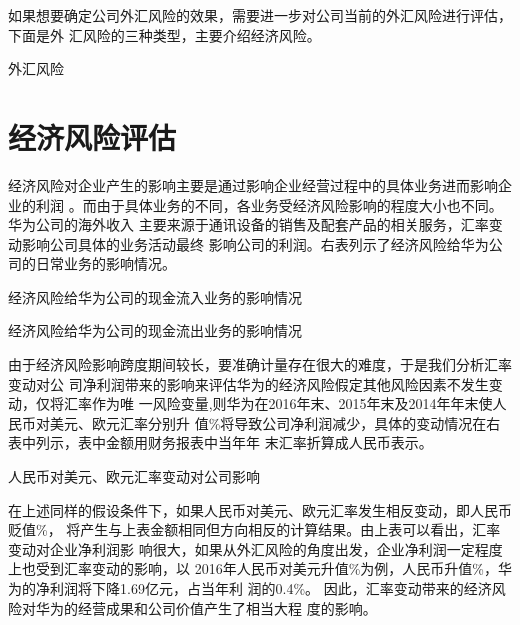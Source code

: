 \documentclass[../main]{subfiles}
\begin{document}
如果想要确定公司外汇风险的效果，需要进一步对公司当前的外汇风险进行评估，下面是外
汇风险的三种类型，主要介绍经济风险。

\begin{table}[htbp]
	\centering
	\caption{外汇风险}
	\label{tab:外汇风险}
\end{table}

\section{经济风险评估}%
\label{sec:经济风险评估}

经济风险对企业产生的影响主要是通过影响企业经营过程中的具体业务进而影响企业的利润
。而由于具体业务的不同，各业务受经济风险影响的程度大小也不同。华为公司的海外收入
主要来源于通讯设备的销售及配套产品的相关服务，汇率变动影响公司具体的业务活动最终
影响公司的利润。右表列示了经济风险给华为公司的日常业务的影响情况。

\begin{table}[htbp]
	\centering
	\caption{经济风险给华为公司的现金流入业务的影响情况}
	\label{tab:经济风险给华为公司的现金流入业务的影响情况}
\end{table}

\begin{table}[htbp]
	\centering
	\caption{经济风险给华为公司的现金流出业务的影响情况}
	\label{tab:经济风险给华为公司的现金流出业务的影响情况}
\end{table}

由于经济风险影响跨度期间较长，要准确计量存在很大的难度，于是我们分析汇率变动对公
司净利润带来的影响来评估华为的经济风险假定其他风险因素不发生变动，仅将汇率作为唯
一风险变量,则华为在2016年末、2015年末及2014年年末使人民币对美元、欧元汇率分别升
值\%将导致公司净利润减少，具体的变动情况在右表中列示，表中金额用财务报表中当年年
末汇率折算成人民币表示。

\begin{table}[htbp]
	\centering
	\caption{人民币对美元、欧元汇率变动对公司影响}
	\label{tab:人民币对美元、欧元汇率变动对公司影响}
\end{table}

在上述同样的假设条件下，如果人民币对美元、欧元汇率发生相反变动，即人民币贬值\%，
将产生与上表金额相同但方向相反的计算结果。由上表可以看出，汇率变动对企业净利润影
响很大，如果从外汇风险的角度出发，企业净利润一定程度上也受到汇率变动的影响，以
2016年人民币对美元升值\%为例，人民币升值\%，华为的净利润将下降1.69亿元，占当年利
润的0.4\%。 因此，汇率变动带来的经济风险对华为的经营成果和公司价值产生了相当大程
度的影响。
\end{document}
